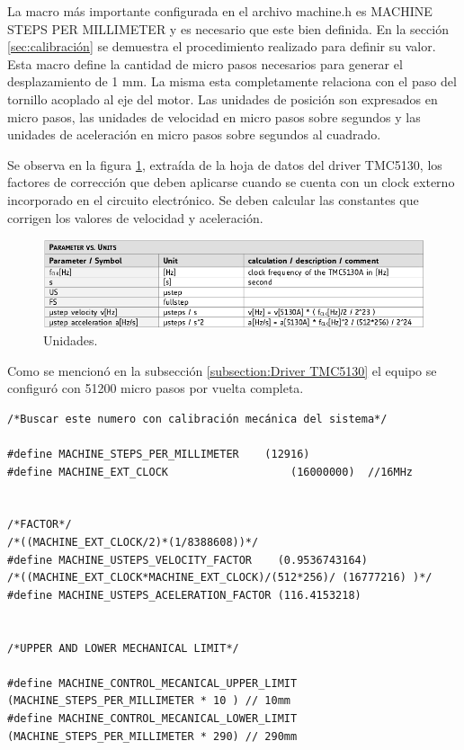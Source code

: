 La macro más importante configurada en el archivo machine.h es MACHINE STEPS PER MILLIMETER y es necesario que este bien definida. En la sección \ref{sec:calibración} se demuestra el procedimiento realizado para definir su valor. Esta macro define la cantidad de micro pasos necesarios para generar el desplazamiento de 1 mm. La misma esta completamente relaciona con el paso del tornillo acoplado al eje del motor. Las unidades de posición son expresados en micro pasos, las unidades de velocidad en micro pasos sobre segundos y las unidades de aceleración en micro pasos sobre segundos al cuadrado.

Se observa en la figura \ref{fig:unidades}, extraída de la hoja de datos del driver TMC5130, los factores de corrección que deben aplicarse cuando se cuenta con un clock externo incorporado en el circuito electrónico. Se deben calcular las constantes que corrigen los valores de velocidad y aceleración.

\begin{figure}[h!]
	\centering
	\includegraphics[width=1\textwidth]{./Figures/unit.png}
	\caption{Unidades.}
	\label{fig:unidades}
\end{figure}


Como se mencionó en la subsección \ref{subsection:Driver TMC5130} el equipo se configuró con 51200 micro pasos por vuelta completa.  
 
 

\begin{lstlisting}[label=cod:vControl,caption=Macros de desplazamiento y factores de conversión.]  % Start your code-block
/*Buscar este numero con calibración mecánica del sistema*/

#define MACHINE_STEPS_PER_MILLIMETER	(12916)		
#define MACHINE_EXT_CLOCK					(16000000)	//16MHz


/*FACTOR*/
/*((MACHINE_EXT_CLOCK/2)*(1/8388608))*/	
#define MACHINE_USTEPS_VELOCITY_FACTOR	  (0.9536743164)
/*((MACHINE_EXT_CLOCK*MACHINE_EXT_CLOCK)/(512*256)/ (16777216) )*/
#define MACHINE_USTEPS_ACELERATION_FACTOR (116.4153218)


/*UPPER AND LOWER MECHANICAL LIMIT*/

#define MACHINE_CONTROL_MECANICAL_UPPER_LIMIT 	(MACHINE_STEPS_PER_MILLIMETER * 10 ) // 10mm
#define MACHINE_CONTROL_MECANICAL_LOWER_LIMIT	(MACHINE_STEPS_PER_MILLIMETER * 290) // 290mm

\end{lstlisting}






